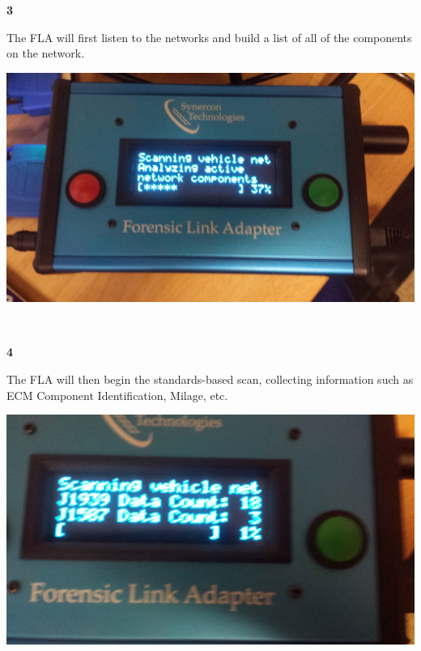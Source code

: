 \documentclass[11pt, oneside]{book}
\begin{document}
\noindent\begin{minipage}{0.45\textwidth}%
\begin{center}
\textbf{3}\\[\baselineskip]
\end{center}
The FLA will first listen to the
networks and build a list of all
of the components on the network.
\end{minipage}%
\hfill%
\begin{minipage}{0.45\textwidth}
\includegraphics[width=\linewidth]{../media/fla_screens/scan_1}
\end{minipage}
\\[\baselineskip]
\noindent\begin{minipage}{0.45\textwidth}%
\begin{center}
\textbf{4}\\[\baselineskip]
\end{center}
The FLA will then begin the standards-based scan, collecting information such as ECM Component Identification, Milage, etc.
\end{minipage}%
\hfill%
\begin{minipage}{0.45\textwidth}
\includegraphics[width=\linewidth]{../media/fla_screens/scan_2}
\end{minipage}
\end{document}
